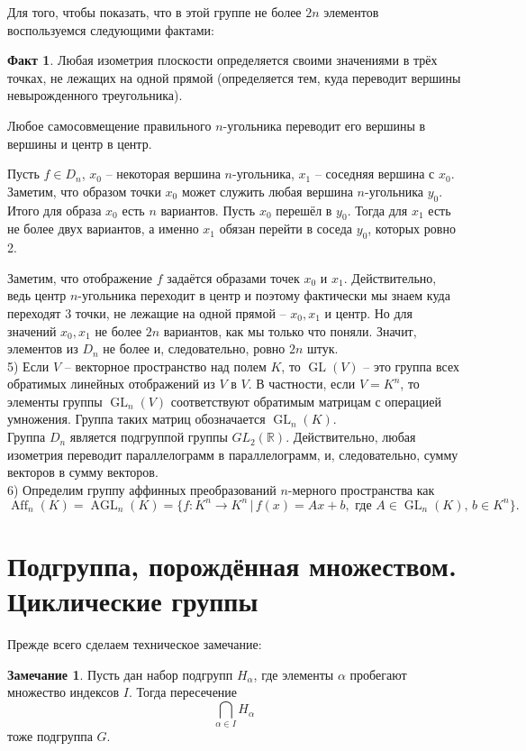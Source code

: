 \documentclass[10pt,a4paper,oneside]{book}
\theoremstyle{definition}
\newtheorem*{rem}{\color{green!50!blue}Замечание}
\newtheorem*{fact}{Факт}
\newcommand{\mb}[1]{\mathbb{#1}}
\newcommand{\GL}{\operatorname{GL}}
\newcommand{\Aff}{\operatorname{Aff}}
\newcommand{\AGL}{\operatorname{AGL}}
\def\rm{\begin{rem}}
\def\erm{\end{rem}}
\def\fct{\begin{fact}}
\def\efct{\end{fact}}
\begin{document}
Для того, чтобы показать, что в этой группе не более $2n$ элементов воспользуемся следующими фактами:

\fct Любая изометрия плоскости определяется своими значениями в трёх точках, не лежащих на одной прямой (определяется тем, куда переводит вершины невырожденного треугольника). 

Любое самосовмещение правильного $n$-угольника переводит его вершины в вершины и центр в центр.
\efct

Пусть $f\in  D_n$, $x_0$ -- некоторая вершина $n$-угольника, $x_1$ -- соседняя вершина с $x_0$. Заметим, что образом точки $x_0$ может служить любая вершина $n$-угольника $y_0$. Итого для образа $x_0$ есть $n$ вариантов. Пусть $x_0$ перешёл в $y_0$. Тогда для $x_1$ есть не более двух вариантов, а именно $x_1$ обязан перейти в соседа $y_0$, которых ровно 2. 

Заметим, что отображение $f$ задаётся образами точек $x_0$ и $x_1$. Действительно, ведь центр $n$-угольника переходит в центр и поэтому фактически мы знаем куда переходят 3 точки, не лежащие на одной прямой -- $x_0, x_1$ и центр. Но для значений $x_0,x_1$ не более $2n$ вариантов, как мы только что поняли. Значит, элементов из $D_n$ не более и, следовательно, ровно $2n$ штук.\\
5) Если $V$ -- векторное пространство над полем $K$, то $\GL(V)$ -- это группа всех обратимых линейных отображений из $V$ в $V$. В частности, если $V=K^n$, то элементы группы $\GL_n(V)$ соответствуют обратимым матрицам с операцией умножения. Группа таких матриц обозначается $\GL_n(K)$.\\

Группа $D_n$ является подгруппой группы $GL_2(\mb R)$. Действительно, любая изометрия переводит параллелограмм в параллелограмм, и, следовательно, сумму векторов в сумму векторов.\\
6) Определим группу аффинных преобразований $n$-мерного пространства как
$$\Aff_n(K)=\AGL_n(K)=\{ f\colon K^n\to K^n\,|\, f(x)=Ax+b, \text{ где } A\in\GL_n(K), \, b \in K^n\}.$$




\section{Подгруппа, порождённая множеством. Циклические группы}

Прежде всего сделаем техническое замечание:

\rm Пусть дан набор подгрупп $H_{\alpha}$, где элементы $\alpha$ пробегают множество индексов $I$. Тогда пересечение $$\bigcap_{\alpha \in I}H_{\alpha}$$
тоже подгруппа $G$.
\erm
\end{document}

